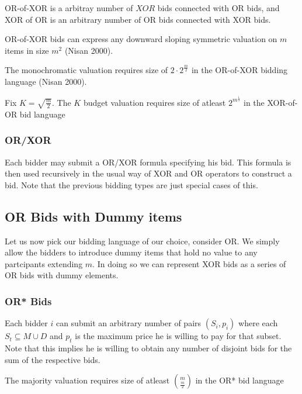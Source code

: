 \documentclass{article}
\begin{document}
\begin{enumerate}
    OR-of-XOR is a arbitray number of \(XOR\) bids connected with OR bids, and XOR of OR is an arbitrary number of OR bids connected with XOR bids.
    
    \begin{lemma}
	OR-of-XOR bids can express any downward sloping symmetric valuation on \(m\) items in size \(m^2\) (Nisan 2000).
\end{lemma}  

    \begin{lemma}
	The monochromatic valuation requires size of \(2\cdot 2^{\frac{m}{2}}\) in the OR-of-XOR  bidding language (Nisan 2000). 
\end{lemma}

    \begin{theorem}
	Fix \(K = \sqrt{\frac{m}{2}}\). The \(K\) budget valuation requires size of atleast \(2^{m^{\frac{1}{4}}}\) in the XOR-of-OR bid language
\end{theorem}  

    \subsubsection{OR/XOR} Each bidder may submit a OR/XOR formula specifying his bid. This formula is then used recursively in the usual way of XOR and OR operators to construct a bid. Note that the previous bidding types are just special cases of this. 
\end{enumerate}

\subsection{OR Bids with Dummy items}
Let us now pick our bidding language of our choice, consider OR. We simply allow the bidders to introduce dummy items that hold no value to any partcipants extending \(m\). In doing so we can represent XOR bids as a series of OR bids with dummy elements. 

\subsubsection{OR* Bids}
Each bidder \(i\) can submit an arbitrary number of pairs \((S_i, p_i)\) where each \(S_t \subseteq M \cup D\) and \(p_t\) is the maximum price he is willing to pay for that subset. Note that this implies he is willing to obtain any number of disjoint bids for the sum of the respective bids. 

\begin{theorem}
	The majority valuation requires size of atleast \(\binom{m}{\frac{m}{2}}\) in the OR* bid language
\end{theorem} 
\end{document}
